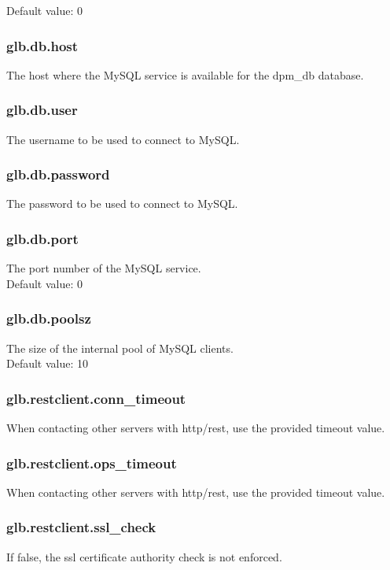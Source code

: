 \documentclass[a4paper,10pt]{scrreprt}
\begin{document}
Default value: 0\\

\subsubsection{glb.db.host}
The host where the MySQL service is available for the dpm\_db database.\\

\subsubsection{glb.db.user}
The username to be used to connect to MySQL.\\

\subsubsection{glb.db.password}
The password to be used to connect to MySQL.\\

\subsubsection{glb.db.port}
The port number of the MySQL service.\\
Default value: 0\\

\subsubsection{glb.db.poolsz}
The size of the internal pool of MySQL clients.\\
Default value: 10\\

\subsubsection{glb.restclient.conn\_timeout}
When contacting other servers with http/rest, use the provided timeout value.
\subsubsection{glb.restclient.ops\_timeout}
When contacting other servers with http/rest, use the provided timeout value.
\subsubsection{glb.restclient.ssl\_check}
If false, the ssl certificate authority check is not enforced.
\end{document}
